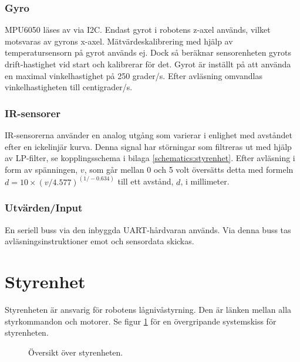 \documentclass[a4paper,11pt]{article}
\begin{document}
\clearpage

\subsubsection{Gyro}
MPU6050 läses av via I2C. Endast gyrot i robotens z-axel används, vilket motsvaras av gyrons x-axel. Mätvärdeskalibrering med hjälp av temperatursensorn på gyrot används ej. Dock så beräknar sensorenheten gyrots drift-hastighet vid start och kalibrerar för det. Gyrot är inställt på att använda en maximal vinkelhastighet på 250 grader/s. Efter avläsning omvandlas vinkelhastigheten till centigrader/s.

\subsubsection{IR-sensorer}
IR-sensorerna använder en analog utgång som varierar i enlighet med avståndet efter en ickelinjär kurva. Denna signal har störningar som filtreras ut med hjälp av LP-filter, se kopplingsschema i bilaga \ref{schematics:styrenhet}. Efter avläsning i form av spänningen, $v$, som går mellan 0 och 5 volt översätts detta med formeln $d = 10 \times (v/4.577) ^{(1/-0.634)}$ till ett avstånd, $d$, i millimeter.

\subsubsection{Utvärden/Input}
En seriell buss via den inbyggda UART-hårdvaran används. Via denna buss tas avläsningsinstruktioner emot och sensordata skickas.

\newpage
\section{Styrenhet} \label{sec:system2}
Styrenheten är ansvarig för robotens lågnivåstyrning. Den är länken mellan alla styrkommandon och motorer. Se figur \ref{fig:unitMotorcontroller} för en övergripande systemskiss för styrenheten.

\begin{figure}[h!]
    \caption{Översikt över styrenheten.}
    \label{fig:unitMotorcontroller}
\end{figure}
\end{document}

